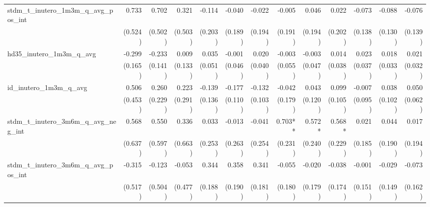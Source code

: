 \begin{tabular}{lrrrrrrrrrrrr}
stdm\_t\_inutero\_1m3m\_q\_avg\_pos\_int    &        0.733 &        0.702 &        0.321 &       -0.114 &       -0.040 &       -0.022 &       -0.005 &        0.046 &        0.022 &       -0.073 &       -0.088 &       -0.076 \\ 
                                            &      (0.524) &      (0.502) &      (0.503) &      (0.203) &      (0.189) &      (0.194) &      (0.191) &      (0.194) &      (0.202) &      (0.138) &      (0.130) &      (0.139) \\ 
hd35\_inutero\_1m3m\_q\_avg                 &       -0.299 &       -0.233 &        0.009 &        0.035 &       -0.001 &        0.020 &       -0.003 &       -0.003 &        0.014 &        0.023 &        0.018 &        0.021 \\ 
                                            &      (0.165) &      (0.141) &      (0.133) &      (0.051) &      (0.046) &      (0.040) &      (0.055) &      (0.047) &      (0.038) &      (0.037) &      (0.033) &      (0.032) \\ 
id\_inutero\_1m3m\_q\_avg                   &        0.506 &        0.260 &        0.223 &       -0.139 &       -0.177 &       -0.132 &       -0.042 &        0.043 &        0.099 &       -0.007 &        0.038 &        0.050 \\ 
                                            &      (0.453) &      (0.229) &      (0.291) &      (0.136) &      (0.110) &      (0.103) &      (0.179) &      (0.120) &      (0.105) &      (0.095) &      (0.102) &      (0.062) \\ 
stdm\_t\_inutero\_3m6m\_q\_avg\_neg\_int    &        0.568 &        0.550 &        0.336 &        0.033 &       -0.013 &       -0.041 &      0.703** &       0.572* &       0.568* &        0.021 &        0.044 &        0.017 \\ 
                                            &      (0.637) &      (0.597) &      (0.663) &      (0.253) &      (0.263) &      (0.254) &      (0.231) &      (0.240) &      (0.229) &      (0.185) &      (0.190) &      (0.194) \\ 
stdm\_t\_inutero\_3m6m\_q\_avg\_pos\_int    &       -0.315 &       -0.123 &       -0.053 &        0.344 &        0.358 &        0.341 &       -0.055 &       -0.020 &       -0.038 &       -0.001 &       -0.029 &       -0.073 \\ 
                                            &      (0.517) &      (0.504) &      (0.477) &      (0.188) &      (0.190) &      (0.181) &      (0.180) &      (0.179) &      (0.174) &      (0.151) &      (0.149) &      (0.162) \\ 

\end{tabular}
